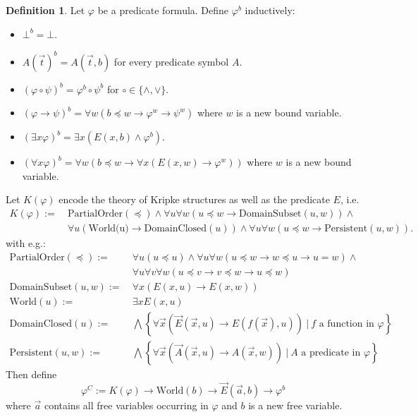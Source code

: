 \documentclass{easychair}
\theoremstyle{definition}
\theoremstyle{definition}
\theoremstyle{definition}
\theoremstyle{definition}
\theoremstyle{definition}
\newtheorem{definition}[theorem]{Definition}
\theoremstyle{definition}
\theoremstyle{definition}
\begin{document}
\begin{definition}\label{def:fo-translation}
	Let $\varphi$ be a predicate formula. Define $\varphi^{b}$ inductively:
	\begin{itemize}\addtolength{\itemsep}{-5pt}
		\item $\bot^b = \bot$.
		\item $A(\vec t)^{b} = A(\vec t, b)$ for every predicate symbol $A$.
		\item $(\varphi\circ\psi)^b = \varphi^b\circ\psi^b$ for $\circ\in\{\wedge, \vee\}$.
		\item $(\varphi\to \psi)^b = \forall w(b\preceq w\to\varphi^{w}\to\psi^{w})$ where $w$ is a new bound variable.
		\item $(\exists x\varphi)^b = \exists x(E(x,b)\wedge\varphi^b)$.
		\item $(\forall x\varphi)^b = \forall w(b\preceq w\to \forall x(E(x, w)\to \varphi^w))$ where $w$ is a new bound variable.
	\end{itemize}
	Let $K(\varphi)$ encode the theory of Kripke structures as well as the predicate $E$, i.e.
	\begin{align*}
		K(\varphi) := \:& \text{PartialOrder}(\preceq) \wedge \forall u \forall w (u\preceq w\to \text{DomainSubset}(u, w)) \wedge\\
		& \forall u(\text{World(u)}\to \text{DomainClosed}(u))\wedge \forall u\forall w (u\preceq w\to \text{Persistent}(u, w)).
	\end{align*}
	with e.g.:
	\begin{align*}
		\text{PartialOrder}(\preceq) := &\:\forall u(u\preceq u)\wedge\forall u\forall w(u\preceq w\to w\preceq u\to u = w)\wedge\\&\:\forall u\forall v\forall w(u\preceq v\to v\preceq w\to u\preceq w)\\
		\text{DomainSubset}(u, w) := &\:\forall x(E(x, u)\to E(x, w))\\
		\text{World}(u) := &\:\exists xE(x, u)\\
		\text{DomainClosed}(u) := &\:\bigwedge\left\{\forall\vec x(\vec E(\vec x, u)\to E(f(\vec x), u))\:|\:\text{$f$ a function in $\varphi$}\right\}\\
		\text{Persistent}(u, w) := &\:\bigwedge\left\{\forall\vec x(\vec A(\vec x, u)\to A(\vec x, w))\:|\:\text{$A$ a predicate in $\varphi$}\right\}
	\end{align*}
	Then define
	\[\varphi^C:= K(\varphi)\to\text{World}(b)\to \vec E(\vec a, b)\to \varphi^b\] where $\vec a$ contains all free variables occurring in $\varphi$ and $b$ is a new free variable.
\end{definition}
\end{document}
